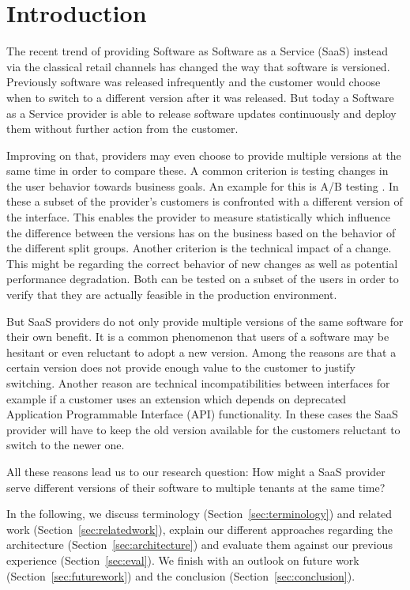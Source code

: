 
\section{Introduction}

The recent trend of providing Software as Software as a Service (SaaS) instead via the classical retail channels has changed the way that software is versioned. Previously software was released infrequently and the customer would choose when to switch to a different version after it was released. But today a Software as a Service provider is able to release software updates continuously and deploy them without further action from the customer.

Improving on that, providers may even choose to provide multiple versions at the same time in order to compare these. A common criterion is testing changes in the user behavior towards business goals. An example for this is A/B testing \cite{Kohavi2007}. In these a subset of the provider's customers is confronted with a different version of the interface. This enables the provider to measure statistically which influence the difference between the versions has on the business based on the behavior of the different split groups. Another criterion is the technical impact of a change. This might be regarding the correct behavior of new changes as well as potential performance degradation. Both can be tested on a subset of the users in order to verify that they are actually feasible in the production environment.

But SaaS providers do not only provide multiple versions of the same software for their own benefit. It is a common phenomenon that users of a software may be hesitant or even reluctant to adopt a new version. Among the reasons are that a certain version does not provide enough value to the customer to justify switching. Another reason are technical incompatibilities between interfaces for example if a customer uses an extension which depends on deprecated Application Programmable Interface (API) functionality.
In these cases the SaaS provider will have to keep the old version available for the customers reluctant to switch to the newer one.

All these reasons lead us to our research question: How might a SaaS provider serve different versions of their software to multiple tenants at the same time?

In the following, we discuss terminology (Section~\ref{sec:terminology}) and related work (Section~\ref{sec:relatedwork}), explain our different approaches regarding the architecture (Section~\ref{sec:architecture}) and evaluate them against our previous experience (Section~\ref{sec:eval}). We finish with an outlook on future work (Section~\ref{sec:futurework}) and the conclusion (Section~\ref{sec:conclusion}).


